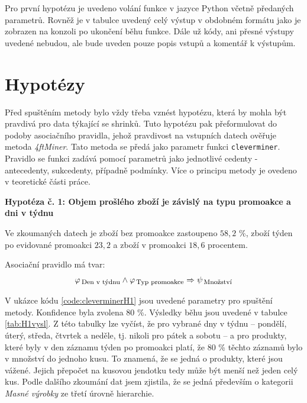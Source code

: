 Pro první hypotézu je uvedeno volání funkce v jazyce Python včetně předaných parametrů. Rovněž je v tabulce uvedený celý výstup v obdobném formátu jako je zobrazen na konzoli po ukončení běhu funkce. Dále už kódy, ani přesné výstupy uvedené nebudou, ale bude uveden pouze popis vstupů a komentář k výstupům. 

\section{Hypotézy}

Před spuštěním metody bylo vždy třeba vznést hypotézu, která by mohla být pravdivá pro data týkající se shrinků. Tuto hypotézu pak přeformulovat do podoby asociačního pravidla, jehož pravdivost  na vstupních datech ověřuje metoda \emph{4ftMiner}. Tato metoda se předá jako parametr funkci \texttt{cleverminer}. Pravidlo se funkci zadává pomocí parametrů jako jednotlivé cedenty - antecedenty, sukcedenty, případně podmínky. Více o principu metody je ovedeno v teoretické části práce.

\vspace*{1em}

\textbf{Hypotéza č. 1: Objem prošlého zboží je závislý na typu promoakce a dni v týdnu}

Ve zkoumaných datech je zboží bez promoakce zastoupeno $58{,}2$ \%, zboží týden po evidované promoakci $23{,}2$ a zboží v promoakci $18{,}6$ procentem. 

Asociační pravidlo má tvar:
\begin{equation}
    \varphi_{\mbox{\,\footnotesize Den v týdnu}} \land \varphi_{\,\mbox{\footnotesize Typ promoakce}} \Rightarrow \psi_{\mbox{\,\footnotesize Množství}}
\end{equation}

V ukázce kódu \ref*{code:cleverminerH1} jsou uvedené parametry pro spuštění metody. Konfidence byla zvolena 80 \%. Výsledky běhu jsou uvedené v tabulce \ref*{tab:H1vysl}. Z této tabulky lze vyčíst, že pro vybrané dny v týdnu -- pondělí, úterý, středa, čtvrtek a neděle, tj. nikoli pro pátek a sobotu -- a pro produkty, které byly v den záznamu týden po promoakci platí, že 80 \% těchto záznamů bylo v množství do jednoho kusu. To znamená, že se jedná o produkty, které jsou vážené. Jejich přepočet na kusovou jendotku tedy může být menší než jeden celý kus. Podle dalšího zkoumání dat jsem zjistila, že se jedná především o kategorii \emph{Masné výrobky} ze třetí úrovně hierarchie.


